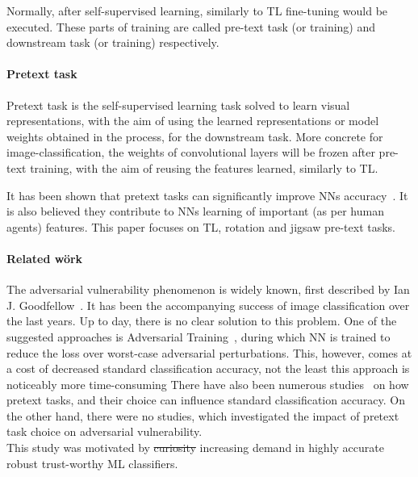 Normally, after self-supervised learning, similarly to TL fine-tuning would be executed.
These parts of training are called pre-text task (or training) and downstream task (or training) respectively.

\paragraph{Pretext task}
Pretext task is the self-supervised learning task solved to learn visual representations,
with the aim of using the learned representations or model weights obtained in the process, for the downstream task.
More concrete for image-classification, the weights of convolutional layers will be frozen after pre-text training,
with the aim of reusing the features learned, similarly to TL.

It has been shown that pretext tasks can significantly improve NNs accuracy~\cite{kolesnikov2019revisiting}.
It is also believed they contribute to NNs learning of important (as per human agents) features.
This paper focuses on TL, rotation and jigsaw pre-text tasks.


\paragraph{Related wörk}
The adversarial vulnerability phenomenon is widely known, first described by Ian J. Goodfellow~\cite{goodfellow2015explaining}.
It has been the accompanying success of image classification over the last years.
Up to day, there is no clear solution to this problem.
One of the suggested approaches is Adversarial Training~\cite{https://doi.org/10.48550/arxiv.1805.12152},
during which NN is trained to reduce the loss over worst-case adversarial perturbations.
This, however, comes at a cost of decreased standard classification accuracy, not the least this approach is noticeably more time-consuming
There have also been numerous studies~\cite{kolesnikov2019revisiting,DBLP:journals/corr/NorooziF16,DBLP:journals/corr/abs-1912-01991}
on how pretext tasks, and their choice can influence standard classification accuracy.
On the other hand, there were no studies, which investigated the impact of pretext task choice on
adversarial vulnerability. \\
This study was motivated by \st{curiosity} increasing demand in highly accurate robust trust-worthy ML classifiers.




